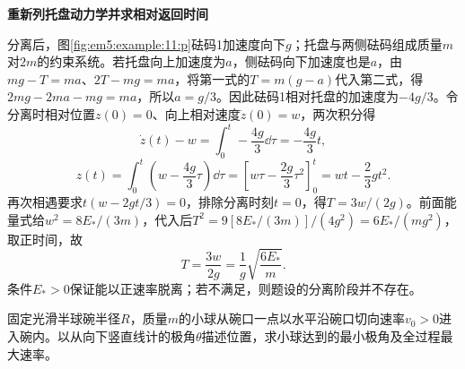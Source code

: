 \begin{solution}
\par\medskip{}\noindent\textbf{重新列托盘动力学并求相对返回时间}\par\nobreak
分离后，图\ref{fig:em5:example:11:p}砝码1加速度向下$g$；托盘与两侧砝码组成质量$m$对$2m$的约束系统。若托盘向上加速度为$a$，侧砝码向下加速度也是$a$，由$mg-T=ma$、$2T-mg=ma$，将第一式的$T=m(g-a)$代入第二式，得$2mg-2ma-mg=ma$，所以$a=g/3$。因此砝码1相对托盘的加速度为$-4g/3$。令分离时相对位置$z(0)=0$、向上相对速度$\dot z(0)=w$，两次积分得
\[
\dot z(t)-w=\int_0^t-\frac{4g}{3}\dd\tau=-\frac{4g}{3}t,
\]
\[
z(t)=\int_0^t\left(w-\frac{4g}{3}\tau\right)\dd\tau
=\left[w\tau-\frac{2g}{3}\tau^2\right]_0^t
=wt-\frac23gt^2.
\]
再次相遇要求$t(w-2gt/3)=0$，排除分离时刻$t=0$，得$T=3w/(2g)$。前面能量式给$w^2=8E_*/(3m)$，代入后$T^2=9[8E_*/(3m)]/(4g^2)=6E_*/(mg^2)$，取正时间，故
\[\boxed{T=\frac{3w}{2g}=\frac1g\sqrt{\frac{6E_*}{m}}}.\]
条件$E_*>0$保证能以正速率脱离；若不满足，则题设的分离阶段并不存在。\end{solution}
\begin{question}\begin{example}[半球碗内的三维回转]\label{em5:example:12}
固定光滑半球碗半径$R$，质量$m$的小球从碗口一点以水平沿碗口切向速率$v_0>0$进入碗内。以从向下竖直线计的极角$\theta$描述位置，求小球达到的最小极角及全过程最大速率。
\end{example}
\end{question}
